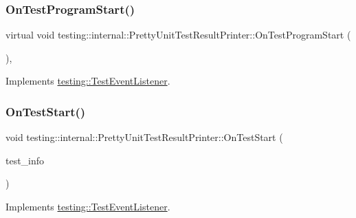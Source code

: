 \subsubsection{\texorpdfstring{OnTestProgramStart()}{OnTestProgramStart()}}
{\footnotesize\ttfamily virtual void testing\+::internal\+::\+Pretty\+Unit\+Test\+Result\+Printer\+::\+On\+Test\+Program\+Start (\begin{DoxyParamCaption}\item[{const \mbox{\hyperlink{classtesting_1_1UnitTest}{Unit\+Test}} \&}]{ }\end{DoxyParamCaption})\hspace{0.3cm}{\ttfamily [inline]}, {\ttfamily [virtual]}}



Implements \mbox{\hyperlink{classtesting_1_1TestEventListener_a5f6c84f39851e8a603a2d2e10063816b}{testing\+::\+Test\+Event\+Listener}}.

\mbox{\label{classtesting_1_1internal_1_1PrettyUnitTestResultPrinter_a5078ee71cfa97e37ae7a9366149195c5}} 
\subsubsection{\texorpdfstring{OnTestStart()}{OnTestStart()}}
{\footnotesize\ttfamily void testing\+::internal\+::\+Pretty\+Unit\+Test\+Result\+Printer\+::\+On\+Test\+Start (\begin{DoxyParamCaption}\item[{const \mbox{\hyperlink{classtesting_1_1TestInfo}{Test\+Info}} \&}]{test\+\_\+info }\end{DoxyParamCaption})\hspace{0.3cm}{\ttfamily [virtual]}}



Implements \mbox{\hyperlink{classtesting_1_1TestEventListener_ab4f6a0ca16ae75daf385b3b5914e1048}{testing\+::\+Test\+Event\+Listener}}.

\mbox{\label{classtesting_1_1internal_1_1PrettyUnitTestResultPrinter_a5b60a9aed1db02837b11450f6e8d0f71}} 
